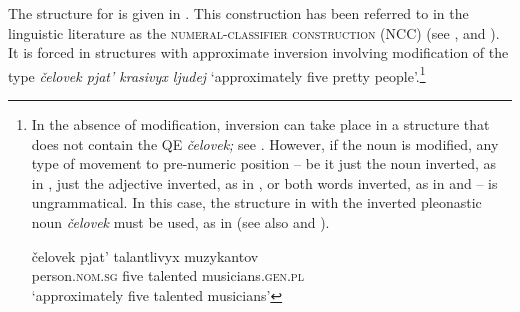 \documentclass[output=paper,
modfonts,
newtxmath,
hidelinks
]{langscibook}
\begin{document}
\noindent The structure for  is given in . This construction has been referred to in the linguistic literature as the \textsc{numeral-classifier construction} (NCC) (see \citealt{Sussex1976}, \citealt{Yadroff1999} and \citealt{Pesetsky2013}). It is forced in structures with approximate inversion involving modification of the type \textit{čelovek pjat’ krasivyx ljudej} `approximately five pretty people'.\footnote{\label{fn11}In the absence of modification, inversion can take place in a structure that does not contain the QE \textit{čelovek;} see . However, if the noun is modified, any type of movement to pre-numeric position -- be it just the noun inverted, as in , just the adjective inverted, as in , or both words inverted, as in  and  -- is ungrammatical. In this case, the structure in  with the inverted pleonastic noun \textit{čelovek} must be used, as in  (see also \citealt{Melčuk1985} and \citealt{Yadroff1999}).%
\begin{multicols}{2}
\ea \label{fn11i}
	\label{fn11ia}\columnbreak
    \label{fn11ib}
    \z
\z
\end{multicols}

\begin{multicols}{2}
\ea \label{fn11ii}
	\columnbreak
    \label{fn11iib}
    \label{fn11iic}
    \label{fn11iid}
    \label{fn11iie}
    \z
\z
\end{multicols}
\ea \label{fn11iii}
    \gll čelovek    pjat’  talantlivyx  muzykantov\\
    	 person.\textsc{nom.sg}   five  talented    musicians.\textsc{gen.pl}\\
         \glt `approximately five talented musicians'
\z 
}
\end{document}

